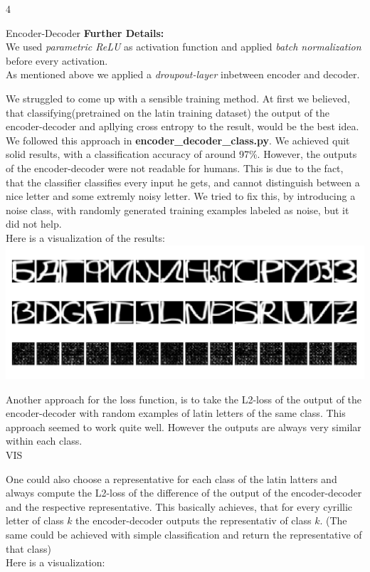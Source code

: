 \documentclass{article}
\begin{document}
\begin{ukon-infie}[28.1.18]{4}
\begin{exercise}[p=60]{Encoder-Decoder}
{		\textbf{Further Details:} \\
		We used \textit{parametric ReLU} as activation function and applied \textit{batch normalization} before every activation.\\
		As mentioned above we applied a \textit{droupout-layer} inbetween encoder and decoder.
		}
		\question{}
		{
		We struggled to come up with a sensible training method. At first we believed, that classifying(pretrained on the latin training dataset) the output of the encoder-decoder and apllying cross entropy to the result, would be the best idea. We followed this approach in \textbf{encoder\_decoder\_class.py}. We achieved quit solid results, with a classification accuracy of around 97\%. However, the outputs of the encoder-decoder were not readable for humans. This is due to the fact, that the classifier classifies every input he gets, and cannot distinguish between a nice letter and some extremly noisy letter. We tried to fix this, by introducing a noise class, with randomly generated training examples labeled as noise, but it did not help. \\
		Here is a visualization of the results:\\
		\includegraphics[scale=0.5]{encoder_decoder_class.png}
		
		
		Another approach for the loss function, is to take the L2-loss of the output of the encoder-decoder with random examples of latin letters of the same class. This approach seemed to work quite well. However the outputs are always very similar within each class.\\
		
		VIS
		
		One could also choose a representative for each class of the latin latters and always compute the L2-loss of the difference of the output of the encoder-decoder and the respective representative. This basically achieves, that for every cyrillic letter of class $k$ the encoder-decoder outputs the representativ of class $k$. (The same could be achieved with simple classification and return the representative of that class)\\
		Here is a visualization:\\
		
}
\end{exercise}
\end{ukon-infie}
\end{document}
